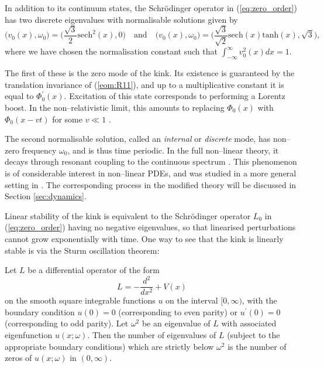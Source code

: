 
In addition to its continuum states, the Schr\"odinger operator in (\ref{eq:zero_order}) has two discrete eigenvalues with normalisable solutions given by
\begin{equation}
\label{eq:flat_vib_modes}
\big(v_0(x),\omega_0\big) = \bigg(\frac{\sqrt{3}}{2}\mathrm{sech}^2(x),0\bigg) \quad \mathrm{and} \quad
\big(v_0(x),\omega_0\big) = \bigg(\frac{\sqrt{3}}{\sqrt{2}}\mathrm{sech}(x)\mathrm{tanh}(x),\sqrt{3}\bigg),
\end{equation}
where we have chosen the normalisation constant such that $\int_{-\infty}^{\infty}v_0^2(x)dx=1$.

The first of these is the zero mode of the kink. Its existence is guaranteed by the translation invariance of (\ref{eom:R11}), and up to a multiplicative constant it is equal to $\Phi_0^\prime(x)$. Excitation of this state corresponds to performing a Lorentz boost. In the non--relativistic limit, this amounts to replacing $\Phi_0(x)$ with $\Phi_0(x-vt)$ for some $v\ll 1$ \cite{Manton&Sutcliffe}.

The second normalisable solution, called an \textit{internal} or \textit{discrete} mode, has non--zero frequency $\omega_0$, and is thus time periodic. In the full non--linear theory, it decays through resonant coupling to the continuous spectrum \cite{Manton&Merabet}. This phenomenon is of considerable interest in non--linear PDEs, and was studied in a more general setting in \cite{SW98}. The corresponding process in the modified theory will be discussed in Section \ref{sec:dynamics}.

Linear stability of the kink is equivalent to the Schr\"odinger operator $L_0$ in (\ref{eq:zero_order}) having no negative eigenvalues, so that linearised perturbations cannot grow exponentially with time. One way to see that the kink is linearly stable is via the Sturm oscillation theorem:

\begin{theo}[Sturm]\label{th:sturm} Let $L$ be a differential operator of the form
\[
L=-\frac{d^2}{dx^2}+V(x)
\]
on the smooth square integrable functions $u$ on the interval $[0,\infty)$, with the boundary condition $u(0)=0$ (corresponding to even parity) or $u^\prime(0)=0$ (corresponding to odd parity). Let $\omega^2$ be an eigenvalue of $L$ with associated eigenfunction $u(x;\omega)$. Then the number of eigenvalues of $L$ (subject to the appropriate boundary conditions) which are strictly below $\omega^2$ is the number of zeros of $u(x;\omega)$ in $(0,\infty)$.
\end{theo}

